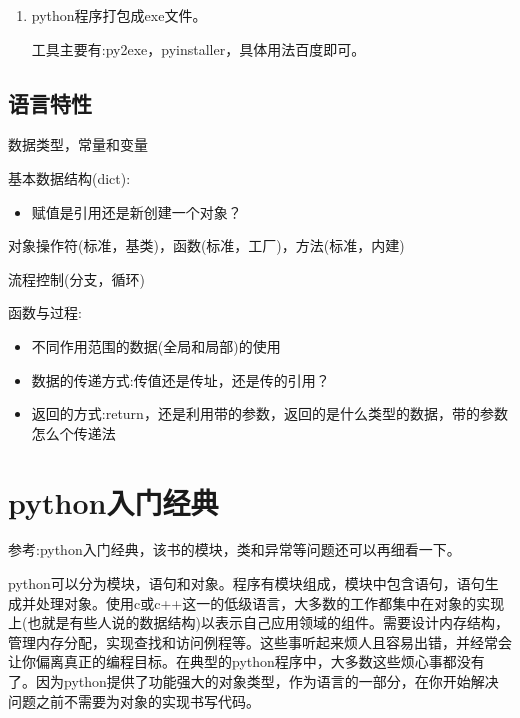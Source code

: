 \documentclass[twoside,11pt]{book}
\begin{document}
\begin{enumerate}
\begin{lstlisting}
    print("\n")
    L=[1,2,3]
    M=["X",L[:],"Y"]#其中L[:]，插入的是L的一个完整复制，因此L和M的修改已经不相关
    N=copy.copy(M)
    S=copy.deepcopy(M)
    print(L)
    print(N)
    print(S)
    L[1]=0
    print(L)
    print(N)
    print(S)
    M[1][1]=5
    print(L)
    print(N)
    print(S)
    M[0]="z"
    print(N)
    print(S)
    \end{lstlisting}

  \item python程序打包成exe文件。

    工具主要有:py2exe，pyinstaller，具体用法百度即可。

\end{enumerate}




\section{语言特性}
数据类型，常量和变量


基本数据结构(dict):
\begin{itemize}
  \item 赋值是引用还是新创建一个对象？
\end{itemize}




对象操作符(标准，基类)，函数(标准，工厂)，方法(标准，内建)



流程控制(分支，循环)



函数与过程:
\begin{itemize}
  \item 不同作用范围的数据(全局和局部)的使用
  \item 数据的传递方式:传值还是传址，还是传的引用？
  \item 返回的方式:return，还是利用带的参数，返回的是什么类型的数据，带的参数怎么个传递法
\end{itemize}







\chapter{python入门经典}


参考:python入门经典，该书的模块，类和异常等问题还可以再细看一下。


python可以分为模块，语句和对象。程序有模块组成，模块中包含语句，语句生成并处理对象。使用c或c++这一的低级语言，大多数的工作都集中在对象的实现上(也就是有些人说的数据结构)以表示自己应用领域的组件。需要设计内存结构，管理内存分配，实现查找和访问例程等。这些事听起来烦人且容易出错，并经常会让你偏离真正的编程目标。在典型的python程序中，大多数这些烦心事都没有了。因为python提供了功能强大的对象类型，作为语言的一部分，在你开始解决问题之前不需要为对象的实现书写代码。
\end{document}
